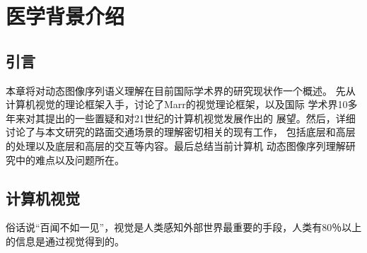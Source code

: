 \chapter{医学背景介绍}
\label{chap2}

\section{引言}

本章将对动态图像序列语义理解在目前国际学术界的研究现状作一个概述。
先从计算机视觉的理论框架入手，讨论了Marr的视觉理论框架，以及国际
学术界10多年来对其提出的一些置疑和对21世纪的计算机视觉发展作出的
展望。然后，详细讨论了与本文研究的路面交通场景的理解密切相关的现有工作，
包括底层和高层的处理以及底层和高层的交互等内容。最后总结当前计算机
动态图像序列理解研究中的难点以及问题所在。

\section{计算机视觉}

俗话说``百闻不如一见''，视觉是人类感知外部世界最重要的手段，人类有80％以上
的信息是通过视觉得到的。
